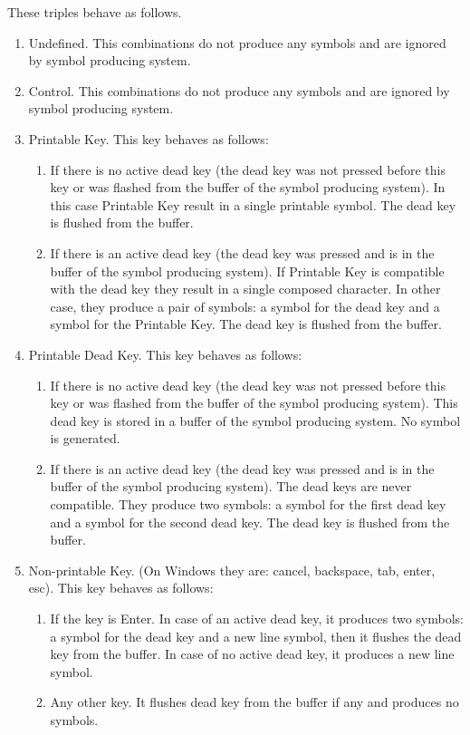 \documentclass{article}
\begin{document}
These triples behave as follows.
\begin{enumerate}
\item Undefined. This combinations do not produce any symbols and are ignored by symbol producing system.
\item Control. This combinations do not produce any symbols and are ignored by symbol producing system.
\item Printable Key. This key behaves as follows:
\begin{enumerate}
\item If there is no active dead key (the dead key was not pressed before this key or was flashed from the buffer of the symbol producing system). In this case Printable Key result in a single printable symbol. The dead key is flushed from the buffer.
\item If there is an active dead key (the dead key was pressed and is in the buffer of the symbol producing system). If Printable Key is compatible with the dead key they result in a single composed character. In other case, they produce a pair of symbols: a symbol for the dead key and a symbol for the Printable Key. The dead key is flushed from the buffer.
\end{enumerate}
\item Printable Dead Key. This key behaves as follows:
\begin{enumerate}
\item If there is no active dead key (the dead key was not pressed before this key or was flashed from the buffer of the symbol producing system). This dead key is stored in a buffer of the symbol producing system. No symbol is generated.
\item If there is an active dead key (the dead key was pressed and is in the buffer of the symbol producing system). The dead keys are never compatible. They produce two symbols: a symbol for the first dead key and a symbol for the second dead key. The dead key is flushed from the buffer.
\end{enumerate}
\item Non-printable Key. (On Windows they are: cancel, backspace, tab, enter, esc). This key behaves as follows:
\begin{enumerate}
\item If the key is Enter. In case of an active dead key, it produces two symbols: a symbol for the dead key and a new line symbol, then it flushes the dead key from the buffer. In case of no active dead key, it produces a new line symbol.
\item Any other key. It flushes dead key from the buffer if any and produces no symbols.
\end{enumerate}
\end{enumerate}
\end{document}

